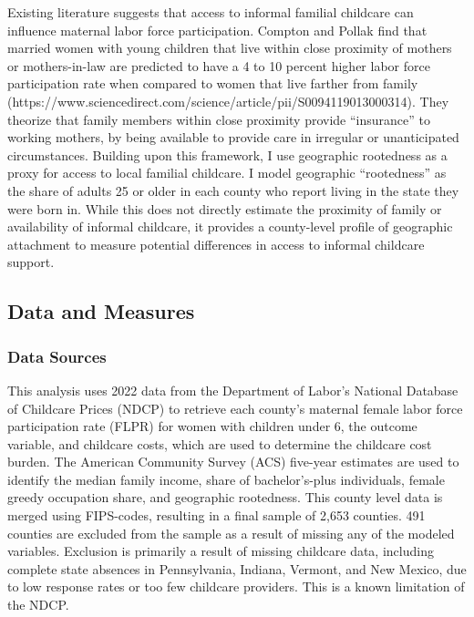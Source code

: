 \documentclass[
  letterpaper,
  DIV=11,
  numbers=noendperiod]{scrartcl}
\begin{document}
Existing literature suggests that access to informal familial childcare
can influence maternal labor force participation. Compton and Pollak
find that married women with young children that live within close
proximity of mothers or mothers-in-law are predicted to have a 4 to 10
percent higher labor force participation rate when compared to women
that live farther from family
(https://www.sciencedirect.com/science/article/pii/S0094119013000314).
They theorize that family members within close proximity provide
``insurance'' to working mothers, by being available to provide care in
irregular or unanticipated circumstances. Building upon this framework,
I use geographic rootedness as a proxy for access to local familial
childcare. I model geographic ``rootedness'' as the share of adults 25
or older in each county who report living in the state they were born
in. While this does not directly estimate the proximity of family or
availability of informal childcare, it provides a county-level profile
of geographic attachment to measure potential differences in access to
informal childcare support.

\subsection{Data and Measures}\label{data-and-measures}

\subsubsection{Data Sources}\label{data-sources}

This analysis uses 2022 data from the Department of Labor's National
Database of Childcare Prices (NDCP) to retrieve each county's maternal
female labor force participation rate (FLPR) for women with children
under 6, the outcome variable, and childcare costs, which are used to
determine the childcare cost burden. The American Community Survey (ACS)
five-year estimates are used to identify the median family income, share
of bachelor's-plus individuals, female greedy occupation share, and
geographic rootedness. This county level data is merged using
FIPS-codes, resulting in a final sample of 2,653 counties. 491 counties
are excluded from the sample as a result of missing any of the modeled
variables. Exclusion is primarily a result of missing childcare data,
including complete state absences in Pennsylvania, Indiana, Vermont, and
New Mexico, due to low response rates or too few childcare providers.
This is a known limitation of the NDCP.
\end{document}
